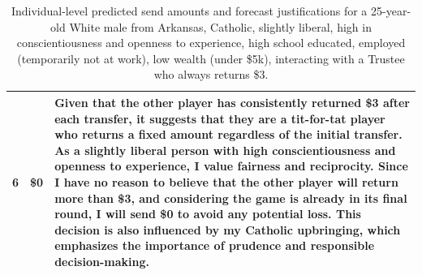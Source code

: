 \documentclass{article} %
\begin{document}
\begin{appendices}
\begin{table}[h]
\begin{tabular}{c|c|p{10cm}}
\midrule
6 & \$0 &
Given that the other player has consistently returned \$3 after each transfer, it suggests that they are a tit-for-tat player who returns a fixed amount regardless of the initial transfer. As a slightly liberal person with high conscientiousness and openness to experience, I value fairness and reciprocity. Since I have no reason to believe that the other player will return more than \$3, and considering the game is already in its final round, I will send \$0 to avoid any potential loss. This decision is also influenced by my Catholic upbringing, which emphasizes the importance of prudence and responsible decision-making. \\
\bottomrule
\end{tabular}
\caption{
Individual-level predicted send amounts and forecast justifications for a 25-year-old White male from Arkansas, Catholic, slightly liberal, high in conscientiousness and openness to experience, high school educated, employed (temporarily not at work), low wealth (under \$5k), interacting with a Trustee who always returns \$3.}
\label{tab:individual-belief-sample-3}
\end{table}


\end{appendices}
\end{document}
